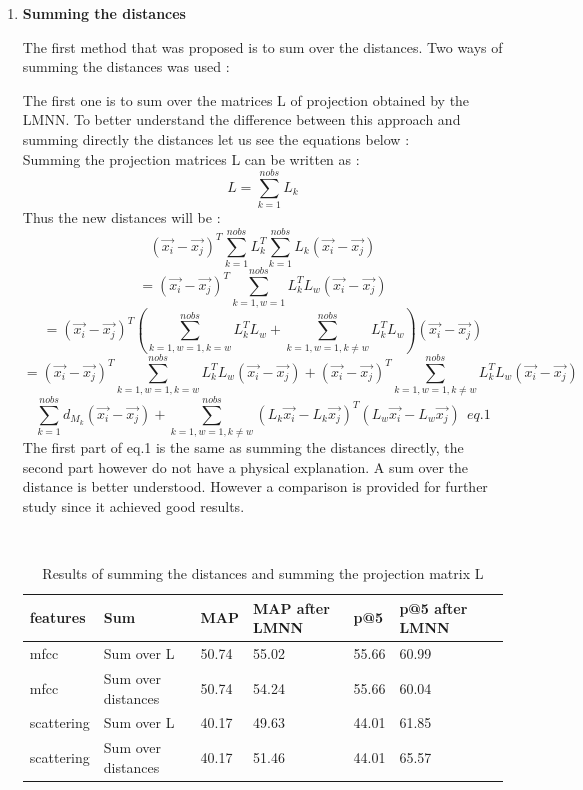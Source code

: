 \documentclass[hidelinks,12pt]{report}
\begin{document}
\begin{enumerate}
\item \textbf{Summing the distances} \par 
The first method that was proposed is to sum over the distances. Two ways of summing the distances was used :\par The first one is to sum over the matrices L of projection obtained by the LMNN. To better understand the difference between this approach and summing directly the distances let us see the equations below : \\
Summing the projection matrices L can be written as :
$$L=\sum_{k=1}^{nobs}L_k$$
Thus the new distances will be :
 $$(\vec{x_i}-\vec{x_j})^T\sum_{k=1}^{nobs}L_k^T\sum_{k=1}^{nobs}L_k(\vec{x_i}-\vec{x_j})$$
  $$=(\vec{x_i}-\vec{x_j})^T\sum_{k=1,w=1}^{nobs}L_k^TL_w(\vec{x_i}-\vec{x_j})$$
  $$=(\vec{x_i}-\vec{x_j})^T(\sum_{k=1,w=1,k=w}^{nobs}L_k^TL_w+\sum_{k=1,w=1,k\neq w}^{nobs}L_k^TL_w)(\vec{x_i}-\vec{x_j})$$
   $$=(\vec{x_i}-\vec{x_j})^T\sum_{k=1,w=1,k=w}^{nobs}L_k^TL_w(\vec{x_i}-\vec{x_j})+(\vec{x_i}-\vec{x_j})^T\sum_{k=1,w=1,k\neq w}^{nobs}L_k^TL_w(\vec{x_i}-\vec{x_j})$$
  $$\sum_{k=1}^{nobs}d_{M_k}(\vec{x_i}-\vec{x_j})+\sum_{k=1,w=1,k\neq w}^{nobs}(L_k\vec{x_i}-L_k\vec{x_j})^T(L_w\vec{x_i}-L_w\vec{x_j})\ \ eq.1$$
 The first part of eq.1 is the same as summing the distances directly, the second part however do not have a physical explanation. A sum over the distance is better understood. However a comparison is provided for further study since it achieved good results.
 
 \begin{table}[H]
\begin{center} 
\ 
 \setlength{\tabcolsep}{.16667em} 
\begin{tabular}{ | l | l | l | l | l | l | l |} 
\hline
features & Sum & MAP & MAP after LMNN & p@5 & p@5 after LMNN  \\ 
\hline 
mfcc & Sum over L& 50.74 &55.02 & 55.66 & 60.99 \\ 
mfcc & Sum over distances & 50.74 & 54.24 & 55.66 & 60.04  \\ 
scattering& Sum over L & 40.17 & 49.63 & 44.01 & 61.85  \\ 
scattering & Sum over distances & 40.17 & 51.46 & 44.01 & 65.57  \\
\hline
\end{tabular} 
\end{center} 
\caption{Results of summing the distances and summing the projection matrix L} 
\label{you} 
\end{table}
 

\end{enumerate}
\end{document}

